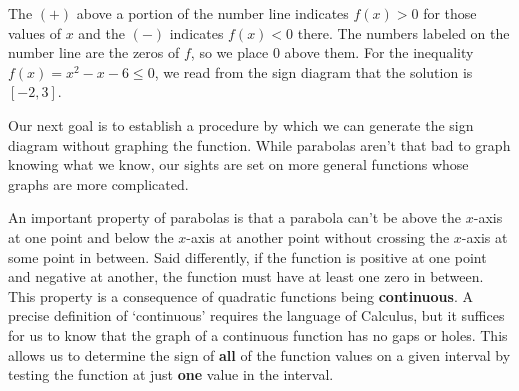 \documentclass{ximera}
\begin{document}
\begin{center}
\begin{image}
\end{image}
\end{center}



The $(+)$ above a portion of the number line indicates $f(x) > 0$ for those values of $x$ and the $(-)$ indicates $f(x) < 0$ there.  The numbers labeled on the number line are the zeros of $f$, so we place $0$ above them.  For the inequality $f(x) = x^2-x-6 \leq 0$, we read from the sign diagram that the solution is $[-2,3]$.  

\medskip

Our next goal is to establish a procedure by which we can generate the sign diagram without graphing the function.  While parabolas aren't that bad to graph knowing what we know, our sights are set on more general functions whose graphs are more complicated.  

\medskip
\enlargethispage{.in}

An important property of parabolas is that a parabola can't be above the $x$-axis at one point and below the $x$-axis at another point without crossing the $x$-axis at some point in between. Said differently, if the function is positive at one point and negative at another, the function must have at least one zero in between.  This property is a consequence of quadratic functions being \textbf{continuous}.  A precise definition of `continuous' requires the language of Calculus, but it suffices for us to know that the graph of a continuous function has no gaps or holes.   This allows us to determine the sign of \textbf{all} of the function values on a given interval by testing the function at just \textbf{one} value in the interval.  
\end{document}
